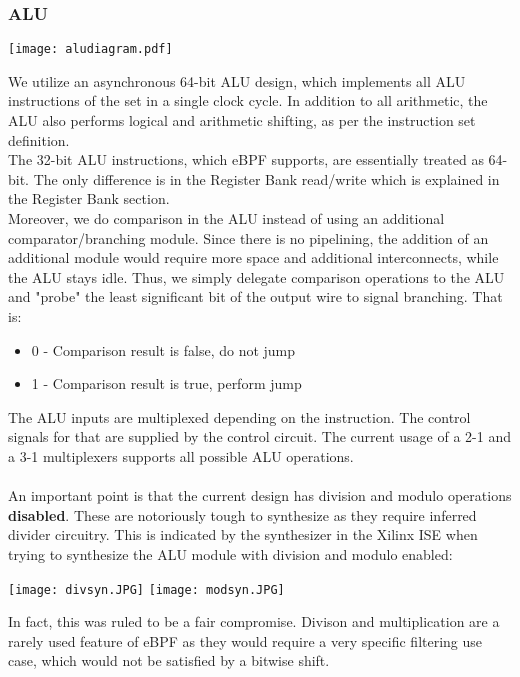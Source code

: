 \documentclass{l4proj}
\begin{document}
\subsubsection{ALU}
\begin{center}
\texttt{[image: aludiagram.pdf]}\\
\end{center}
We utilize an asynchronous 64-bit ALU design, which implements all ALU instructions of the set in a single clock cycle. In addition to all arithmetic, the ALU also performs logical and arithmetic shifting, as per the instruction set definition.\\
The 32-bit ALU instructions, which eBPF supports, are essentially treated as 64-bit. The only difference is in the Register Bank read/write which is explained in the Register Bank section. \\
Moreover, we do comparison in the ALU instead of using an additional comparator/branching module. Since there is no pipelining, the addition of an additional module would require more space and additional interconnects, while the ALU stays idle. Thus, we simply delegate comparison operations to the ALU and "probe" the least significant bit of the output wire to signal branching. That is:
\begin{itemize}
    \item 0 - Comparison result is false, do not jump
    \item 1 - Comparison result is true, perform jump
\end{itemize}
The ALU inputs are multiplexed depending on the instruction. The control signals for that are supplied by the control circuit. The current usage of a 2-1 and a 3-1 multiplexers supports all possible ALU operations.\\\\
An important point is that the current design has division and modulo operations \textbf{disabled}. These are notoriously tough to synthesize as they require inferred divider circuitry. This is indicated by the synthesizer in the Xilinx ISE when trying to synthesize the ALU module with division and modulo enabled:\\
\begin{center}
\texttt{[image: divsyn.JPG]}
\texttt{[image: modsyn.JPG]}
\end{center}
In fact, this was ruled to be a fair compromise. Divison and multiplication are a rarely used feature of eBPF as they would require a very specific filtering use case, which would not be satisfied by a bitwise shift.\\
\end{document}

